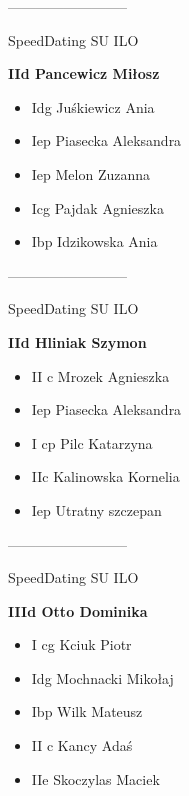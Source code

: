 \documentclass[a4paper,10pt]{article}
\begin{document}
\begin{multicols}{3}
\begin{minipage}[l]{\textwidth}
\end{minipage}



\begin{minipage}[l]{\textwidth}
--------------------------

  \footnotesize{SpeedDating SU ILO}

  \bfseries{IId Pancewicz Miłosz}

  \begin{itemize}
    \item Idg Juśkiewicz Ania
    \item Iep Piasecka Aleksandra
    \item Iep Melon Zuzanna
    \item Icg Pajdak Agnieszka
    \item Ibp Idzikowska Ania

    \end{itemize}



\end{minipage}



\begin{minipage}[l]{\textwidth}
--------------------------

  \footnotesize{SpeedDating SU ILO}

  \bfseries{IId Hliniak Szymon}

  \begin{itemize}
    \item II c Mrozek Agnieszka
    \item Iep Piasecka Aleksandra
    \item I cp Pilc Katarzyna
    \item IIc Kalinowska Kornelia
    \item Iep Utratny szczepan

    \end{itemize}



\end{minipage}



\begin{minipage}[l]{\textwidth}
--------------------------

  \footnotesize{SpeedDating SU ILO}

  \bfseries{IIId Otto Dominika}

  \begin{itemize}
    \item I cg Kciuk Piotr
    \item Idg Mochnacki Mikołaj
    \item Ibp Wilk Mateusz
    \item II c Kancy Adaś
    \item IIe Skoczylas Maciek


\end{itemize}
\end{minipage}
\end{multicols}
\end{document}
